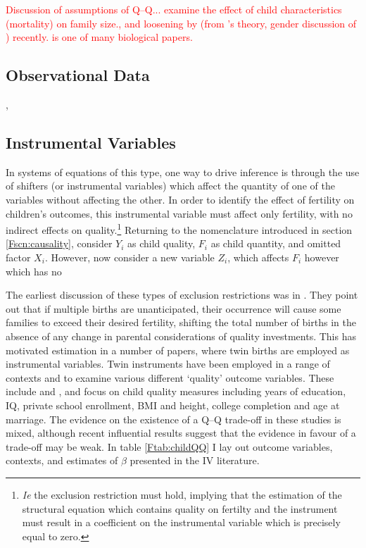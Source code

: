 \textcolor{red}{Discussion of assumptions of Q--Q...
 examine the effect of child 
characteristics (mortality) on family size., and loosening by 
\citet{AizerCunha2012} (from \citet{Behrmanetal1982}'s theory, gender discussion 
of \citet{ButcherCase1994}) recently. \citet{Lawsonetal2012} is one of many 
biological papers.}

\subsection{Observational Data}
\citet{ButcherCase1994}, \citet{Hanushek1992}

\subsection{Instrumental Variables}
In systems of equations of this type, one way to drive inference is through the
use of shifters (or instrumental variables) which affect the quantity of one of
the variables without affecting the other.  In order to identify the effect of 
fertility on children's outcomes, this instrumental variable must affect only 
fertility, with no indirect effects on quality.\footnote{\emph{Ie} the exclusion 
restriction must hold, implying that the estimation of the structural equation 
which contains quality on fertilty and the instrument must result in a 
coefficient on the instrumental variable which is precisely equal to zero.}
Returning to the nomenclature introduced in section \ref{Fscn:causality},
consider $Y_i$ as child quality, $F_i$ as child quantity, and omitted factor
$X_i$.  However, now consider a new variable $Z_i$, which affects $F_i$ however
which has no 

The earliest discussion of these types of exclusion restrictions was in 
\citet{RosenzweigWolpin1980}. They point out that if multiple births are 
unanticipated, their occurrence will cause some families to exceed their desired
fertility, shifting the total number of births in the absence of any change in 
parental considerations of quality investments.  This has motivated estimation 
in a number of papers, where twin births are employed as instrumental 
variables.  Twin instruments have been employed in a range of contexts and
to examine various different `quality' outcome variables.  These include
\citet{Blacketal2005,Caceres2006,Lietal2008,Dayiogluetal2009,Sanhueza2009,
Blacketal2010,Angristetal2010,FitzsimonsMalde2010} and 
\citet{SouzaPonczek2012}, and focus on child quality measures including years of 
education, IQ, private school enrollment, BMI and height, college completion and 
age at marriage.  The evidence on the existence of a Q--Q trade-off in these 
studies is mixed, although recent influential results suggest that the evidence 
in favour of a trade-off may be weak.  In table \ref{Ftab:childQQ} I lay out 
outcome variables, contexts, and estimates of $\beta$ presented in the IV 
literature.

